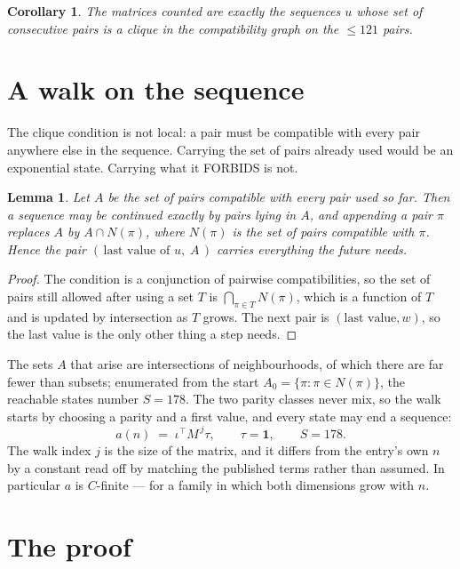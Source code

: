 \documentclass[11pt,a4paper]{article}
\theoremstyle{plain}
\newtheorem{lemma}[theorem]{Lemma}
\newtheorem{corollary}[theorem]{Corollary}
\theoremstyle{definition}
\begin{document}
\begin{corollary}
The matrices counted are exactly the sequences $u$ whose set of consecutive pairs is a clique in
the compatibility graph on the $\le 121$ pairs.
\end{corollary}

\section{A walk on the sequence}

The clique condition is not local: a pair must be compatible with every pair anywhere else in
the sequence. Carrying the set of pairs already used would be an exponential state. Carrying
what it FORBIDS is not.

\begin{lemma}\label{lem:lump}
Let $A$ be the set of pairs compatible with every pair used so far. Then a sequence may be
continued exactly by pairs lying in $A$, and appending a pair $\pi$ replaces $A$ by
$A\cap N(\pi)$, where $N(\pi)$ is the set of pairs compatible with $\pi$. Hence the pair
$(\,\text{last value of }u,\;A\,)$ carries everything the future needs.
\end{lemma}

\begin{proof}
The condition is a conjunction of pairwise compatibilities, so the set of pairs still allowed
after using a set $T$ is $\bigcap_{\pi\in T}N(\pi)$, which is a function of $T$ and is updated
by intersection as $T$ grows. The next pair is $(\text{last value},w)$, so the last value is
the only other thing a step needs.
\end{proof}

The sets $A$ that arise are intersections of neighbourhoods, of which there are far fewer than
subsets; enumerated from the start $A_0=\{\pi:\pi\in N(\pi)\}$, the reachable states number
$S=178$. The two parity classes never mix, so the walk starts by choosing a parity and a first
value, and every state may end a sequence:
\[
a(n)\;=\;\iota^{\!\top}M^{\,j}\tau ,\qquad \tau=\mathbf{1},\qquad S=178.
\]
The walk index $j$ is the size of the matrix, and it differs from the entry's own $n$ by a
constant read off by matching the published terms rather than assumed. In particular $a$ is
$C$-finite --- for a family in which both dimensions grow with $n$.

\section{The proof}
\end{document}
